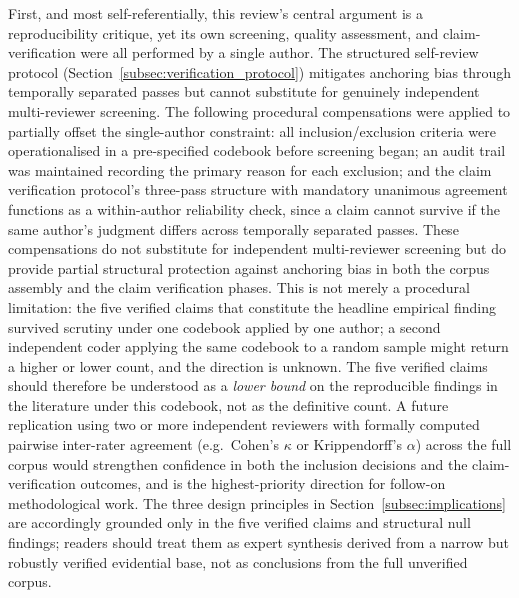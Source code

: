 First, and most self-referentially, this review's central argument is a
reproducibility critique, yet its own screening, quality assessment, and
claim-verification were all performed by a single author.
The structured self-review protocol (Section~\ref{subsec:verification_protocol})
mitigates anchoring bias through temporally separated passes but cannot substitute
for genuinely independent multi-reviewer screening.
The following procedural compensations were applied to partially offset the single-author constraint: all inclusion/exclusion criteria were operationalised in a pre-specified codebook before screening began; an audit trail was maintained recording the primary reason for each exclusion; and the claim verification protocol's three-pass structure with mandatory unanimous agreement functions as a within-author reliability check, since a claim cannot survive if the same author's judgment differs across temporally separated passes.
These compensations do not substitute for independent multi-reviewer screening but do provide partial structural protection against anchoring bias in both the corpus assembly and the claim verification phases.
This is not merely a procedural limitation: the five verified claims that constitute
the headline empirical finding survived scrutiny under one codebook applied by one
author; a second independent coder applying the same codebook to a random sample
might return a higher or lower count, and the direction is unknown.
The five verified claims should therefore be understood as a \emph{lower bound}
on the reproducible findings in the literature under this codebook, not as the
definitive count.
A future replication using two or more independent reviewers with formally
computed pairwise inter-rater agreement (e.g.\ Cohen's $\kappa$ or Krippendorff's
$\alpha$) across the full corpus would strengthen confidence in both the inclusion
decisions and the claim-verification outcomes, and is the highest-priority
direction for follow-on methodological work.
The three design principles in Section~\ref{subsec:implications} are accordingly grounded only in the five verified claims and structural null findings; readers should treat them as expert synthesis derived from a narrow but robustly verified evidential base, not as conclusions from the full unverified corpus.

